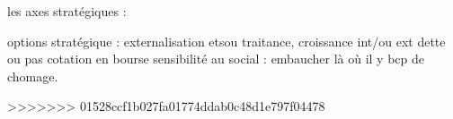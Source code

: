 \documentclass[a4paper,12pt]{article}
\begin{document}
 
 les axes stratégiques : 
 
 options stratégique : 
 externalisation etsou traitance,
 croissance int/ou ext
 dette ou pas
 cotation en bourse
 sensibilité au social : embaucher là où il y bcp de chomage.
 
 
 
 
 
>>>>>>> 01528ccf1b027fa01774ddab0c48d1e797f04478
  
%
%

\newpage
\nocite{*}  %


%
%
%
%
\end{document}

